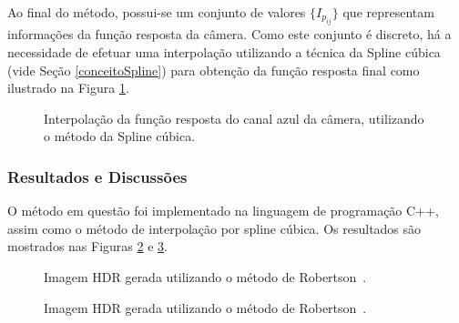 Ao final do método, possui-se um conjunto de valores $\{I_{p_{ij}}\}$ que representam informações da função resposta da câmera. Como este conjunto é discreto, há a necessidade de efetuar uma interpolação utilizando a técnica da Spline cúbica (vide Seção \ref{conceitoSpline}) para obtenção da função resposta final como ilustrado na Figura \ref{figRobertsonPontos}. 

\begin{figure}[H]
  \centering
  \quad %
  \caption{Interpolação da função resposta do canal azul da câmera, utilizando o método da Spline cúbica.}
  \label{figRobertsonPontos}
\end{figure}

\subsubsection{Resultados e Discussões} \label{metodoRobertsonResultado}

O método em questão foi implementado na linguagem de programação C++, assim como o método de interpolação por spline cúbica. Os resultados são mostrados nas Figuras \ref{figRobertsonOlhinhos} e \ref{figRobertsonPorquinho}.

\begin{figure}[H]
  \centering
  \quad %
  \quad %
  \caption{Imagem HDR gerada utilizando o método de Robertson~\etal.}
  \label{figRobertsonOlhinhos}
\end{figure}

\begin{figure}[H]
  \centering
  \quad %
  \caption{Imagem HDR gerada utilizando o método de Robertson~\etal.}
  \label{figRobertsonPorquinho}
\end{figure}

